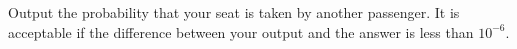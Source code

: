 Output the probability that your seat is taken by another passenger.
It is acceptable if the difference between your output and the answer is
less than $10^{-6}$.
